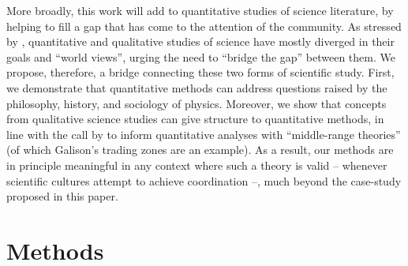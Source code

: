\documentclass[smallextended]{svjour3}
\begin{document}





More broadly, this work will add to quantitative studies of science literature, by helping to fill a gap that has come to the attention of the community.  As stressed by \citet{Kang2020,Leydesdorff2020,Bowker2020}, quantitative and qualitative studies of science have mostly diverged in their goals and ``world views'', urging the need to ``bridge the gap'' between them. We propose, therefore, a bridge connecting these two forms of scientific study. First, we demonstrate that quantitative methods can address questions raised by the philosophy, history, and sociology of physics. Moreover, we show that concepts from qualitative 
 science studies can give structure to quantitative methods, in line with the call by \citealt{Heinze2020} to inform quantitative analyses with ``middle-range theories'' (of which Galison's trading zones are an example). As a result, our methods are in principle meaningful in any context where such a theory is valid -- whenever scientific cultures attempt to achieve coordination --, much beyond the case-study proposed in this paper.%

\section{Methods}\label{section:method}
\end{document}
